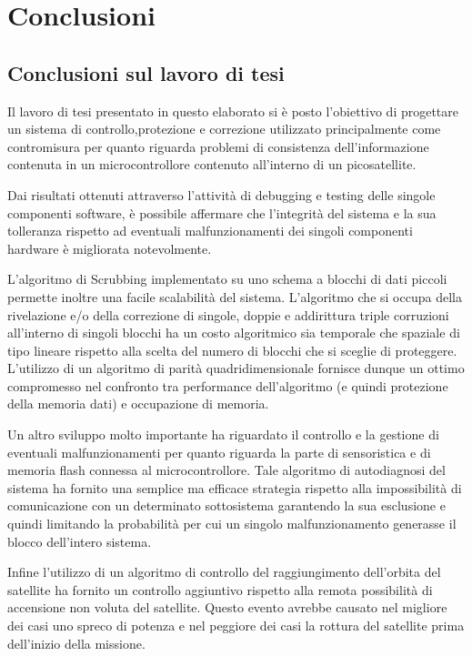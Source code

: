 \documentclass[LaM,binding=0.6cm]{../sapthesis}
\begin{document}
\chapter{Conclusioni}

\section{Conclusioni sul lavoro di tesi}

Il lavoro di tesi presentato in questo elaborato si è posto l'obiettivo di progettare un sistema di controllo,protezione e correzione
utilizzato principalmente come contromisura per quanto riguarda problemi di consistenza dell'informazione contenuta in un microcontrollore contenuto all'interno di un picosatellite.

Dai risultati ottenuti attraverso l'attività di debugging e testing delle singole componenti software, è possibile affermare che l'integrità 
del sistema e la sua tolleranza rispetto ad eventuali malfunzionamenti dei singoli componenti hardware è migliorata notevolmente.

L'algoritmo di Scrubbing implementato su uno schema a blocchi di dati piccoli permette inoltre una facile scalabilità del sistema. L'algoritmo che
si occupa della rivelazione e/o della correzione di singole, doppie e addirittura triple corruzioni all'interno di
singoli blocchi ha un costo algoritmico sia temporale che spaziale di tipo lineare rispetto alla scelta del numero di blocchi che si sceglie di 
proteggere. L'utilizzo di un algoritmo di parità quadridimensionale fornisce dunque un ottimo compromesso nel confronto tra performance dell'algoritmo (e
quindi protezione della memoria dati) e occupazione di memoria.

Un altro sviluppo molto importante ha riguardato il controllo e la gestione di eventuali malfunzionamenti per quanto riguarda la parte di sensoristica 
e di memoria flash connessa al microcontrollore. Tale algoritmo di autodiagnosi del sistema ha fornito una semplice ma efficace strategia rispetto
alla impossibilità di comunicazione con un determinato sottosistema garantendo la sua esclusione e quindi limitando la probabilità per cui un singolo
malfunzionamento generasse il blocco dell'intero sistema.

Infine l'utilizzo di un algoritmo di controllo del raggiungimento dell'orbita del satellite ha fornito un controllo aggiuntivo rispetto alla remota possibilità
di accensione non voluta del satellite. Questo evento avrebbe causato nel migliore dei casi uno spreco di potenza e nel peggiore dei casi la rottura del satellite
prima dell'inizio della missione.
\end{document}
